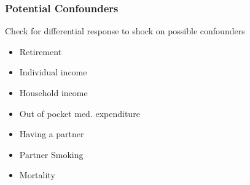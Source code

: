 \documentclass[10pt,compress,xcolor=dvipsnames,aspectratio=169]{beamer}    %
\newcounter{ex}
\newcommand{\1}[1]{\mathrm{1\hspace*{-2.5pt}l}[#1]}	%
\begin{document}
\begin{frame}
\frametitle{Potential Confounders}
\label{frame:Confounders}
Check for differential response to shock on possible confounders \cite{Pei2018}
\begin{itemize}
	\item Retirement 		\hyperlink{fig:retire}{\beamergotobutton{}}
	\item Individual income \hyperlink{fig:wage}{\beamergotobutton{}}
	\item Household income	\hyperlink{fig:hhinc}{\beamergotobutton{}}
	\item Out of pocket med. expenditure   \hyperlink{fig:oome}{\beamergotobutton{}}
	\item Having a partner	\hyperlink{fig:mpart}{\beamergotobutton{}}
	\item Partner Smoking	\hyperlink{fig:smokePartner}{\beamergotobutton{}}
	\item Mortality \hyperlink{fig:dead2}{} \hyperlink{fig:dead5}{}
\end{itemize}

\end{frame}
\end{document}
